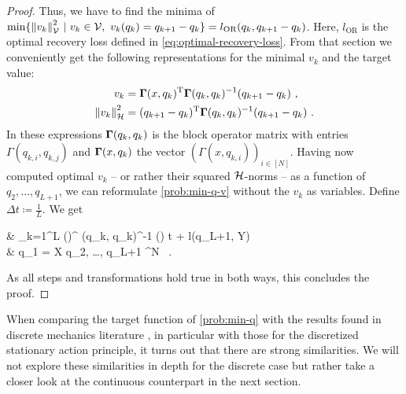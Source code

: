 \begin{proof}
	Thus, we have to find the minima of $\min\{\norm{v_k}_{\mathcal{V}}^2\ |\ v_k \in \mathcal{V},\ v_k(q_k) = q_{k+1} - q_k\} = l_{\text{OR}}(q_k, q_{k+1} - q_k)$.
	Here, $l_{\text{OR}}$ is the optimal recovery loss defined in \cref{eq:optimal-recovery-loss}.
	From that section we conveniently get the following representations for the minimal $v_k$ and the target value:
	\begin{align}
		v_k & = \mathbf{\Gamma}(x, q_k)^\mathrm{T}\mathbf{\Gamma}(q_k, q_k)^{-1} (q_{k+1} - q_k) \ ,\\
		\norm{v_k}_{\mathcal{H}}^2 &= (q_{k+1} - q_k)^\mathrm{T} \mathbf{\Gamma}(q_k, q_k)^{-1} (q_{k+1} - q_k) \ .
	\end{align}
	In these expressions $\mathbf{\Gamma}(q_k, q_k)$ is the block operator matrix with entries $\Gamma(q_{k,i}, q_{k, j})$ and $\mathbf{\Gamma}(x, q_k)$ the vector $(\Gamma(x, q_{k, i}))_{i \in [N]}$.
	Having now computed optimal $v_k$ -- or rather their squared $\mathcal{H}$-norms -- as a function of $q_2, \ldots, q_{L+1}$, we can reformulate \cref{prob:min-q-v} without the $v_k$ as variables.
	Define $\Delta t \coloneqq \frac{1}{L}$.
	We get
	\begin{problem}
		\begin{cases}
			 & \nu \cdot {} \sum_{k=1}^{L}  
			\left(\right)^ \bGamma(q_k, q_k)^{-1}
			\left(\right) \cdot \Delta t
			+ l(q_{L+1}, Y) \\
			 & q_1 = X  q_2, \ldots, q_{L+1} \in \cX^N \ .
		\end{cases}
	\end{problem}
	As all steps and transformations hold true in both ways, this concludes the proof.
\end{proof}

When comparing the target function of \cref{prob:min-q} with the results found in discrete mechanics literature \cite[~Chapter VI.6.2]{hairer06}, in particular with those for the discretized stationary action principle, it turns out that there are strong similarities.
We will not explore these similarities in depth for the discrete case but rather take a closer look at the continuous counterpart in the next section.